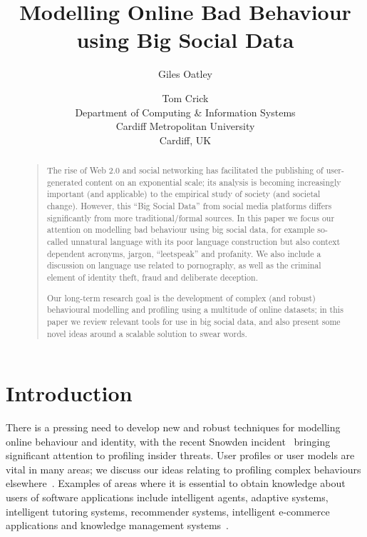 \documentclass[letterpaper]{article}
\begin{document}
\title{Modelling Online Bad Behaviour using Big Social Data}
\author{Giles Oatley \and Tom Crick\\
Department of Computing \& Information Systems\\
Cardiff Metropolitan University\\
Cardiff, UK
}

\maketitle

\begin{abstract}
\begin{quote}
The rise of Web 2.0 and social networking has facilitated the
publishing of user-generated content on an exponential scale; its
analysis is becoming increasingly important (and applicable) to the
empirical study of society (and societal change). However, this ``Big
Social Data'' from social media platforms differs significantly from
more traditional/formal sources.  In this paper we focus our attention
on modelling bad behaviour using big social data, for example
so-called unnatural language with its poor language construction but
also context dependent acronyms, jargon, ``leetspeak'' and
profanity. We also include a discussion on language use related to
pornography, as well as the criminal element of identity theft, fraud
and deliberate deception.

Our long-term research goal is the development of complex (and robust)
behavioural modelling and profiling using a multitude of online
datasets; in this paper we review relevant tools for use in big social
data, and also present some novel ideas around a scalable solution to
swear words.
\end{quote}
\end{abstract}


\section{Introduction}

There is a pressing need to develop new and robust techniques for
modelling online behaviour and identity, with the recent Snowden
incident~\cite{greenwald:2014} bringing significant attention to
profiling insider threats. User profiles or user models are vital in
many areas; we discuss our ideas relating to profiling complex
behaviours elsewhere~\cite{oatley+crick:2014}.  Examples of areas
where it is essential to obtain knowledge about users of software
applications include intelligent agents, adaptive systems, intelligent
tutoring systems, recommender systems, intelligent e-commerce
applications and knowledge management
systems~\cite{schiaffino+amandi:2009}.
\end{document}
